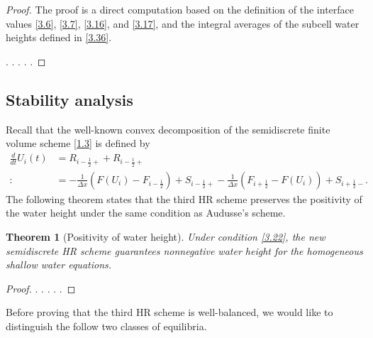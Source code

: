 \documentclass[11pt,a4paper,center,notitlepage]{article}
\numberwithin{equation}{section}
\newtheorem{theorem}{Theorem}
\begin{document}
\begin{proof}
The proof is a direct computation based on the definition of the interface values \eqref{3.6}, \eqref{3.7}, \eqref{3.16}, and \eqref{3.17}, and the integral averages of the subcell water heights defined in \eqref{3.36}.

. . . . . 
\end{proof}

\subsection{Stability analysis}
Recall that the well-known convex decomposition of the semidiscrete finite volume scheme \eqref{1.3} is defined by
\begin{align}
\frac{d}{{dt}}{U_i}\left( t \right) &= {R_{i - \frac{1}{2} + }} + {R_{i - \frac{1}{2} + }}\\
: &=  - \frac{1}{{\Delta x}}\left( {F\left( {{U_i}} \right) - {F_{i - \frac{1}{2}}}} \right) + {S_{i - \frac{1}{2} + }} - \frac{1}{{\Delta x}}\left( {{F_{i + \frac{1}{2}}} - F\left( {{U_i}} \right)} \right) + {S_{i + \frac{1}{2} - }}.
\end{align}
The following theorem states that the third HR scheme preserves the positivity of the water height under the same condition as Audusse's scheme.

\begin{theorem}[Positivity of water height] 
Under condition \eqref{3.22}, the new semidiscrete HR scheme guarantees nonnegative water height for the homogeneous shallow water equations.
\end{theorem}

\begin{proof}
. . . . .
\end{proof}
Before proving that the third HR scheme is well-balanced, we would like to distinguish the follow two classes of equilibria.
\end{document}
